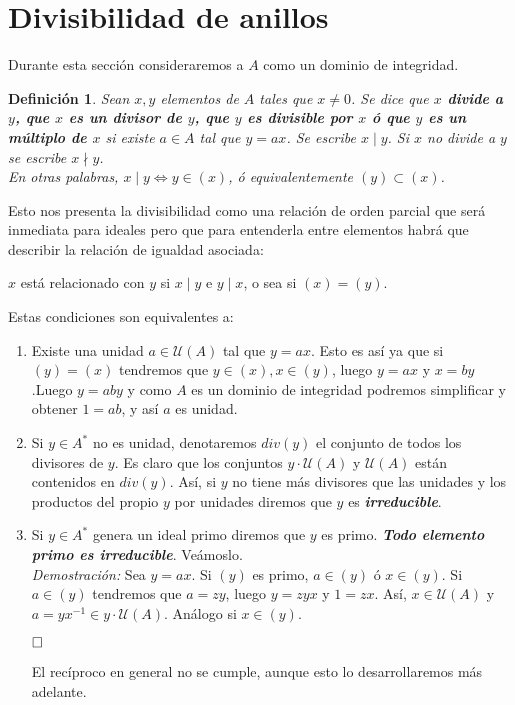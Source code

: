 \documentclass[12pt]{article}
\newtheorem{definition}[theorem]{Definición}
\begin{document}
\section{Divisibilidad de anillos}

Durante esta sección consideraremos a $A$ como un dominio de integridad.

\begin{definition} Sean $x, y$ elementos de $A$ tales que $x \neq 0$. Se dice que \textbf{$x$ divide a $y$, que $x$ es un divisor de $y$, que $y$ es divisible por $x$ ó que $y$ es un múltiplo de $x$} si existe $a \in A$ tal que $y = ax$. Se escribe $x \mid y$. Si $x$ no divide a $y$ se escribe $x \nmid y$.\vspace{0.2cm}\\
En otras palabras, $x \mid y \Leftrightarrow y \in (x)$, ó equivalentemente $(y) \subset (x)$.
\end{definition}

Esto nos presenta la divisibilidad como una relación de orden parcial que será inmediata para ideales pero que para entenderla entre elementos habrá que describir la relación de igualdad asociada: 
\begin{center}
$x$ está relacionado con $y$ si $x \mid y$ e $y \mid x$, o sea si $(x) = (y).$
\end{center} 
Estas condiciones son equivalentes a: \begin{enumerate}
\item Existe una unidad $a \in \mathcal{U}(A)$ tal que $y = ax$. Esto es así ya que si $(y) = (x)$ tendremos que $y \in (x), x \in (y)$, luego $y = ax$ y $x = by$.Luego $y = aby$ y como $A$ es un dominio de integridad podremos simplificar y obtener $1 = ab$, y así $a$ es unidad.
\item Si $y \in A^{\ast}$ no es unidad, denotaremos $div(y)$ el conjunto de todos los divisores de $y$. Es claro que los conjuntos $y \cdot \mathcal{U}(A)$ y $\mathcal{U}(A)$ están contenidos en $div(y)$. Así, si $y$ no tiene más divisores que las unidades y los productos del propio $y$ por unidades diremos que $y$ es \textbf{\textit{irreducible}}.
\item Si $y \in A^{\ast}$ genera un ideal primo diremos que $y$ es primo. \textbf{\textit{Todo elemento primo es irreducible}}. Veámoslo. \vspace{0.2cm}\\
\emph{Demostración: } Sea $y = ax$. Si $(y)$ es primo, $a \in (y)$ ó $x \in (y)$. Si $a \in (y)$ tendremos que $a = zy$, luego $y = zyx$ y $1 = zx$. Así, $x \in \mathcal{U}(A)$ y $a = yx^{-1} \in y \cdot \mathcal{U}(A)$. Análogo si $x \in (y)$.

$\hfill \square$

El recíproco en general no se cumple, aunque esto lo desarrollaremos más adelante.
\end{enumerate} 
\end{document}
